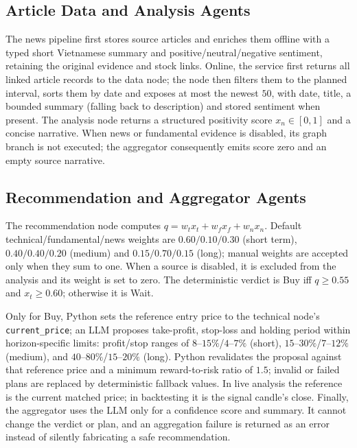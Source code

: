 \documentclass[runningheads]{llncs}
\begin{document}
\subsection{Article Data and Analysis Agents}
\label{sec:news}

The news pipeline first stores source articles and enriches them offline with a
typed short Vietnamese summary and positive/neutral/negative sentiment, retaining
the original evidence and stock links. Online, the service first returns all linked
article records to the data node; the node then filters them to the planned interval,
sorts them by date and exposes at most the newest $50$, with date, title, a bounded
summary (falling back to description) and stored sentiment when present. The
analysis node returns a structured positivity score $x_n\in[0,1]$ and a concise
narrative. When news or fundamental evidence is disabled, its graph branch is not
executed; the aggregator consequently emits score zero and an empty source
narrative.

\subsection{Recommendation and Aggregator Agents}
\label{sec:aggregator}
The recommendation node computes
$q=w_t x_t+w_f x_f+w_n x_n$. Default
technical/fundamental/news weights are $0.60/0.10/0.30$ (short term),
$0.40/0.40/0.20$ (medium) and $0.15/0.70/0.15$ (long); manual weights are accepted
only when they sum to one. When a source is disabled, it is excluded from the
analysis and its weight is set to zero. The deterministic verdict is \textsf{Buy}
iff $q\geq0.55$ and
$x_t\geq0.60$; otherwise it is \textsf{Wait}.

Only for \textsf{Buy}, Python sets the reference entry price to the technical
node's \texttt{current\_price}; an LLM proposes take-profit, stop-loss and holding
period within horizon-specific limits: profit/stop ranges of $8$--$15\%$/$4$--$7\%$
(short), $15$--$30\%$/$7$--$12\%$ (medium), and
$40$--$80\%$/$15$--$20\%$ (long). Python revalidates the proposal against that
reference price and a minimum reward-to-risk ratio of $1.5$; invalid or failed
plans are replaced by deterministic fallback values. In live analysis the
reference is the current matched price; in backtesting it is the signal candle's
close. Finally, the aggregator uses the LLM only for a confidence score and
summary. It cannot change the verdict or plan, and an aggregation failure is
returned as an error instead of silently fabricating a safe recommendation.
\end{document}

